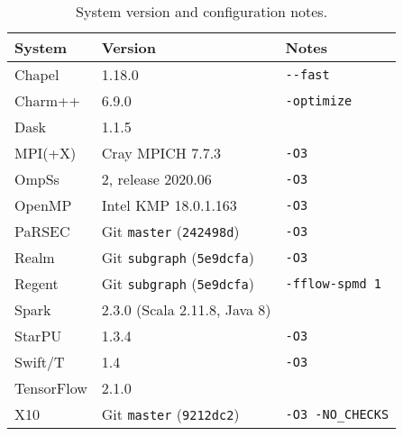 \begin{table}[t]
\small
\begin{tabular}{@{} l | l | l @{}}
System & Version & Notes \\
\hline
Chapel & 1.18.0 & {\lstinline!--fast!} \\
Charm++ & 6.9.0 & {\lstinline!-optimize!} \\
Dask & 1.1.5 & \\
MPI(+X) & Cray MPICH 7.7.3 & {\lstinline!-O3!} \\
OmpSs & 2, release 2020.06 & {\lstinline!-O3!} \\
OpenMP & Intel KMP 18.0.1.163 & {\lstinline!-O3!} \\
PaRSEC & Git {\lstinline!master!} (\lstinline!242498d!) & {\lstinline!-O3!} \\
Realm & Git {\lstinline!subgraph!} (\lstinline!5e9dcfa!) & {\lstinline!-O3!} \\
Regent & Git {\lstinline!subgraph!} (\lstinline!5e9dcfa!) & {\lstinline!-fflow-spmd 1!} \\
Spark & 2.3.0 (Scala 2.11.8, Java 8) & \\
StarPU & 1.3.4 & {\lstinline!-O3!} \\
Swift/T & 1.4 & {\lstinline!-O3!} \\
TensorFlow & 2.1.0 & \\
X10 & Git {\lstinline!master!} (\lstinline!9212dc2!) & {\lstinline!-O3 -NO_CHECKS!}
\end{tabular}

\caption{System version and configuration notes.\label{tab:flags}}
\vspace{-0.5cm}
\end{table}
